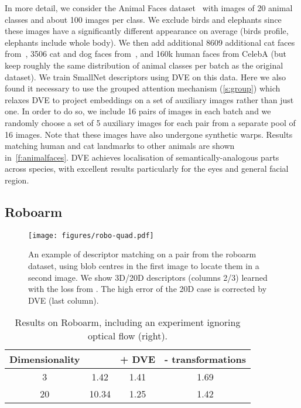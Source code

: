 \documentclass[10pt,twocolumn,letterpaper]{article}
\begin{document}
In more detail, we consider the Animal Faces dataset~\cite{si2012learning} with images of 20 animal classes and about 100 images per class.
We exclude birds and elephants since these images have a significantly different appearance on average (birds profile, elephants include whole body).
We then add additional 8609 additional cat faces from~\cite{zhang2008cat}, 3506 cat and dog faces from~\cite{parkhi12a}, and 160k human faces from CelebA (but keep roughly the same distribution of animal classes per batch as the original dataset).
We train SmallNet descriptors using DVE on this data.  Here we also found it necessary to use the grouped attention mechanism (\cref{s:group}) which relaxes DVE to project embeddings on a set of auxiliary images rather than just one.
In order to do so, we include 16 pairs of images  in each batch and we randomly choose a set of 5 auxiliary images for each pair from a separate pool of 16 images.
Note that these images have also undergone synthetic warps.  Results matching human and cat landmarks to other animals are shown in~\cref{f:animalfaces}.  DVE achieves localisation of semantically-analogous parts across species, with excellent results particularly for the eyes and general facial region.

\subsection{Roboarm}\label{s:robo}

\begin{figure}[h]
\centering
\texttt{[image: figures/robo-quad.pdf]}
\caption{An example of descriptor matching on a pair from the roboarm dataset, using blob centres in the first image to locate them in a second image.
We show 3D/20D descriptors (columns 2/3) learned with the loss from \cite{thewlis17Bunsupervised}.
The high error of the 20D case is corrected by DVE (last column).}\label{f:descmatchingroboarm}
\vspace{-0.25cm}
\end{figure} 


\begin{table}[h]
\centering
\setlength{\tabcolsep}{0.5em}
	\begin{tabular}{cccc}
		\toprule
		Dimensionality    & \cite{thewlis17Bunsupervised} & + DVE   & - transformations \\
		\midrule
		3                 & 1.42                          & 1.41                & 1.69              \\
		20                & 10.34                         & 1.25                & 1.42              \\
		\bottomrule
	\end{tabular}
    \medskip
	\caption{Results on Roboarm, including an experiment ignoring optical flow (right).}
	\label{t:roboarmresults}
\end{table}
\end{document}
